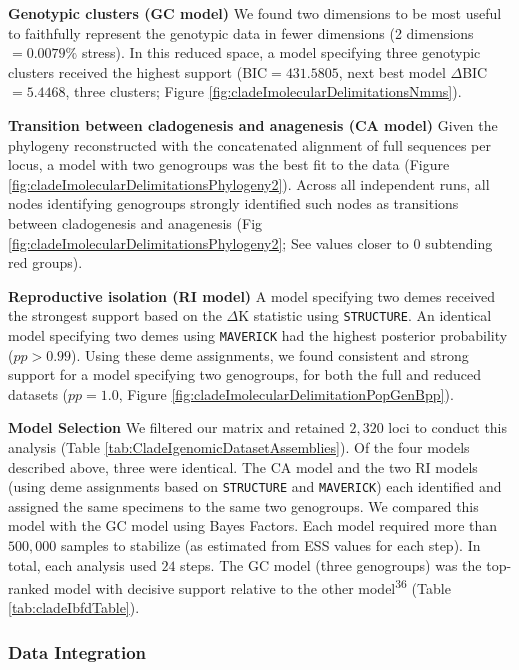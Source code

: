 \documentclass[
  11pt,
]{article}
\begin{document}
\textbf{Genotypic clusters (GC model)} We found two dimensions to be most useful to faithfully represent the genotypic data in fewer dimensions (2 dimensions \(=0.0079\%\) stress). In this reduced space, a model specifying three genotypic clusters received the highest support (BIC\(=431.5805\), next best model \(\Delta\)BIC\(=5.4468\), three clusters; Figure \ref{fig:cladeImolecularDelimitationsNmms}).

\textbf{Transition between cladogenesis and anagenesis (CA model)} Given the phylogeny reconstructed with the concatenated alignment of full sequences per locus, a model with two genogroups was the best fit to the data (Figure \ref{fig:cladeImolecularDelimitationsPhylogeny2}). Across all independent runs, all nodes identifying genogroups strongly identified such nodes as transitions between cladogenesis and anagenesis (Fig \ref{fig:cladeImolecularDelimitationsPhylogeny2}; See values closer to \(0\) subtending red groups).

\textbf{Reproductive isolation (RI model)} A model specifying two demes received the strongest support based on the \(\Delta\)K statistic using \texttt{STRUCTURE}. An identical model specifying two demes using \texttt{MAVERICK} had the highest posterior probability (\(pp>0.99\)). Using these deme assignments, we found consistent and strong support for a model specifying two genogroups, for both the full and reduced datasets (\(pp=1.0\), Figure \ref{fig:cladeImolecularDelimitationPopGenBpp}).

\textbf{Model Selection} We filtered our matrix and retained \(2,320\) loci to conduct this analysis (Table \ref{tab:CladeIgenomicDatasetAssemblies}). Of the four models described above, three were identical. The CA model and the two RI models (using deme assignments based on \texttt{STRUCTURE} and \texttt{MAVERICK}) each identified and assigned the same specimens to the same two genogroups. We compared this model with the GC model using Bayes Factors. Each model required more than \(500,000\) samples to stabilize (as estimated from ESS values for each step). In total, each analysis used \(24\) steps. The GC model (three genogroups) was the top-ranked model with decisive support relative to the other model\textsuperscript{36} (Table \ref{tab:cladeIbfdTable}).

\hypertarget{data-integration-1}{%
\subsubsection{Data Integration}\label{data-integration-1}}
\end{document}
